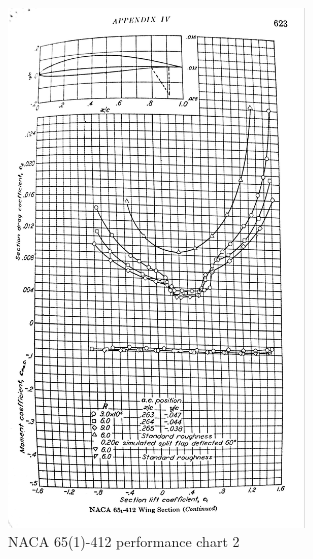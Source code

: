 \documentclass[conf]{new-aiaa}
\begin{document}
\begin{figure}[H]
    \centering
    \includegraphics[width=0.7\textwidth]{plots/Airfoil65_1_412-b}
    \caption{NACA 65(1)-412 performance chart 2}
    \label{fig:NACA_65412B}
\end{figure}
\end{document}

